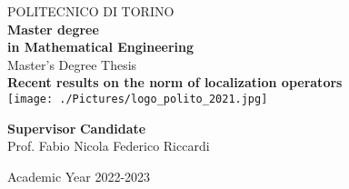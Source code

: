 \begin{titlepage}


\begin{center}

{\huge POLITECNICO DI TORINO}\\[1.5cm]
\textbf{Master degree \\in Mathematical Engineering}\\[3cm]

{\Large Master's Degree Thesis}\\[0.5cm]
\textbf{\LARGE Recent results on the norm of localization operators}\\[2cm]
\texttt{[image: ./Pictures/logo\_polito\_2021.jpg]}
\vspace{4cm}


\begin{minipage}{0.85\textwidth}
\begin{flushleft}\large
\textbf{Supervisor} \hfill \textbf{Candidate}\\
Prof. Fabio Nicola \hfill Federico Riccardi\\
\end{flushleft}
\end{minipage}

\vfill

Academic Year 2022-2023
\end{center}

\restoregeometry %

\end{titlepage}